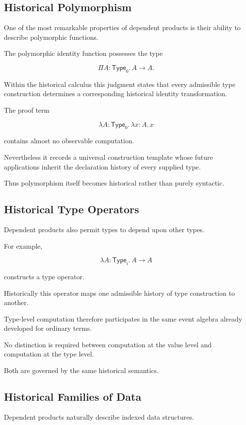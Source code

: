 \documentclass[12pt,oneside]{article}
\theoremstyle{definition}
\theoremstyle{remark}
\newcommand{\Type}{\mathsf{Type}}
\begin{document}
\subsection{Historical Polymorphism}

One of the most remarkable properties of dependent products is their ability to
describe polymorphic functions.

The polymorphic identity function possesses the type

\[
\Pi A:\Type_0.\,
A\rightarrow A.
\]

Within the historical calculus this judgment states that every admissible type
construction determines a corresponding historical identity transformation.

The proof term

\[
\lambda A:\Type_0.\,
\lambda x:A.\,
x
\]

contains almost no observable computation.

Nevertheless it records a universal construction template whose future
applications inherit the declaration history of every supplied type.

Thus polymorphism itself becomes historical rather than purely syntactic.

\subsection{Historical Type Operators}

Dependent products also permit types to depend upon other types.

For example,

\[
\lambda A:\Type_i.\,
A\rightarrow A
\]

constructs a type operator.

Historically this operator maps one admissible history of type construction to
another.

Type-level computation therefore participates in the same event algebra already
developed for ordinary terms.

No distinction is required between computation at the value level and
computation at the type level.

Both are governed by the same historical semantics.

\subsection{Historical Families of Data}

Dependent products naturally describe indexed data structures.
\end{document}

